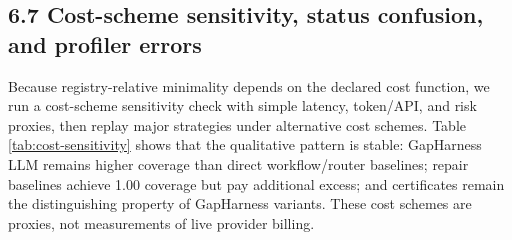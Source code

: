 \documentclass[
  10pt,
]{article}
\begin{document}
\subsection{6.7 Cost-scheme sensitivity, status confusion, and profiler
errors}\label{cost-scheme-sensitivity-status-confusion-and-profiler-errors}

Because registry-relative minimality depends on the declared cost
function, we run a cost-scheme sensitivity check with simple latency,
token/API, and risk proxies, then replay major strategies under
alternative cost schemes. Table \ref{tab:cost-sensitivity} shows that
the qualitative pattern is stable: GapHarness LLM remains higher
coverage than direct workflow/router baselines; repair baselines achieve
1.00 coverage but pay additional excess; and certificates remain the
distinguishing property of GapHarness variants. These cost schemes are
proxies, not measurements of live provider billing.

\begin{table}[H]
\centering
\tiny
\caption{Cost sensitivity on GapBench test800. Costs are declared/proxy schemes over the same selected modules.}
\label{tab:cost-sensitivity}
\end{table}
\end{document}
